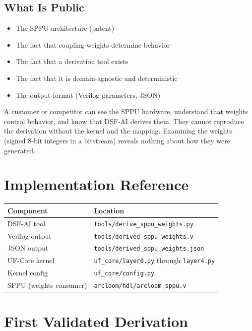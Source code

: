 \documentclass[11pt,a4paper]{article}
\begin{document}
\subsection{What Is Public}

\begin{itemize}[nosep]
\item The SPPU architecture (patent)
\item The fact that coupling weights determine behavior
\item The fact that a derivation tool exists
\item The fact that it is domain-agnostic and deterministic
\item The output format (Verilog parameters, JSON)
\end{itemize}

A customer or competitor can see the SPPU hardware, understand that
weights control behavior, and know that DSF-AI derives them. They
cannot reproduce the derivation without the kernel and the mapping.
Examining the weights (signed 8-bit integers in a bitstream) reveals
nothing about how they were generated.

\section{Implementation Reference}

\begin{center}
\begin{tabular}{@{}ll@{}}
\toprule
\textbf{Component} & \textbf{Location} \\
\midrule
DSF-AI tool & \texttt{tools/derive\_sppu\_weights.py} \\
Verilog output & \texttt{tools/derived\_sppu\_weights.v} \\
JSON output & \texttt{tools/derived\_sppu\_weights.json} \\
UF-Core kernel & \texttt{uf\_core/layer0.py} through \texttt{layer4.py} \\
Kernel config & \texttt{uf\_core/config.py} \\
SPPU (weights consumer) & \texttt{arcloom/hdl/arcloom\_sppu.v} \\
\bottomrule
\end{tabular}
\end{center}

\section{First Validated Derivation}
\end{document}
